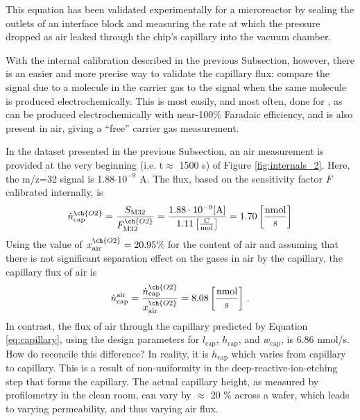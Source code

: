 This equation has been validated experimentally for a microreactor by sealing the outlets of an interface block and measuring the rate at which the pressure dropped as air leaked through the chip's capillary into the vacuum chamber\cite{Henriksen2009}.

With the internal calibration described in the previous Subsection, however, there is an easier and more precise way to validate the capillary flux: compare the signal due to a molecule in the carrier gas to the signal when the same molecule is produced electrochemically. This is most easily, and most often, done for , as  can be produced electrochemically with near-100\% Faradaic efficiency, and is also present in air, giving a ``free'' carrier gas measurement.

In the dataset presented in the previous Subsection, an air measurement is provided at the very beginning (i.e. t$\approx$ 1500 s) of Figure \ref{fig:internals_2}. Here, the m/z=32 signal is 1.88$\cdot 10^{-9}$ A. The  flux, based on the sensitivity factor $F$ calibrated internally, is
\begin{equation}
\dot{n}^{\ch{O2}}_\text{cap} = \frac{S_\text{M32}}{F^{\ch{O2}}_\text{M32}} = \frac{1.88\cdot 10^{-9} \text{[A]}}{1.11 \left[\frac{\text{C}}{\text{mol}}\right]} = 1.70 \left[\frac{\text{nmol}}{\text{s}}\right]
\end{equation}
Using the value of $x^{\ch{O2}}_\text{air}=20.95$\% for the  content of air and assuming that there is not significant separation effect on the gases in air by the capillary, the capillary flux of air is 
\begin{equation}
\dot{n}^{\text{air}}_\text{cap} = \frac{\dot{n}^{\ch{O2}}_\text{cap}}{x^{\ch{O2}}_\text{air}} = 8.08 \left[\frac{\text{nmol}}{\text{s}}\right]\,.
\end{equation}
In contrast, the flux of air through the capillary predicted by Equation \ref{eq:capillary}, using the design parameters for $l_\text{cap}$, $h_\text{cap}$, and $w_\text{cap}$, is 6.86 nmol/s. How do reconcile this difference? In reality, it is $h_\text{cap}$ which varies from capillary to capillary. This is a result of non-uniformity in the deep-reactive-ion-etching step that forms the capillary\cite{Trimarco2017_PhD}. The actual capillary height, as measured by profilometry in the clean room, can vary by $\approx$ 20 \% across a wafer, which leads to varying permeability, and thus varying air flux. 

